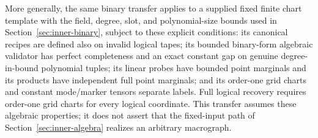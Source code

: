 \begin{proposition}
More generally, the same binary transfer applies to a supplied fixed
finite chart template with the field, degree, slot, and polynomial-size
bounds used in Section~\ref{sec:inner-binary}, subject to these explicit
conditions: its canonical
recipes are defined also on invalid logical tapes; its bounded
binary-form algebraic validator has perfect completeness and an exact
constant gap on genuine degree-in-bound polynomial tuples; its linear
probes have bounded point marginals and its products have independent
full point marginals; and its order-one grid charts and constant
mode/marker tensors separate labels. Full logical recovery requires
order-one grid charts for every logical coordinate. This transfer
assumes these algebraic properties; it does not assert that the
fixed-input path of Section~\ref{sec:inner-algebra} realizes an
arbitrary macrograph.
\end{proposition}

